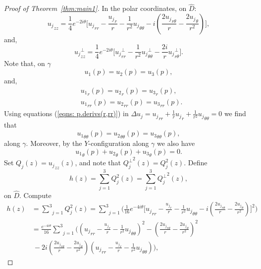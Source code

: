 \documentclass[11pt]{amsart}
\numberwithin{equation}{section}
\theoremstyle{theorem}
\theoremstyle{definition}
\numberwithin{equation}{section}
\begin{document}
\begin{proof}[Proof of Theorem~\ref{thm:main1}]
 In the polar coordinates, on $\hat{D}$:
 $$
 {u_j}_{zz} =\frac{1}{4} e^{-2i\theta}\Big[  {u_j}_{rr}-\frac{{u_j}_r}{r} - \frac{1}{r^2} {u_j}_{\theta \theta} - i(\frac{2{u_j}_{r\theta}}{r}-\frac{2{u_j}_{\theta}}{r^2}) \Big],
 $$
 and,
 $$
{u_j}_{zz}^{\perp} =\frac{1}{4} e^{-2i\theta}\Big[  {u_j}_{rr}^{\perp} - \frac{1}{r^2} {u_j}_{\theta \theta}^{\perp} - \frac{2i}{r} {u_j}_{r\theta}^{\perp} \Big].
$$
Note that, on $\gamma$ 
$$
u_1(p)=u_2(p)=u_3(p),
$$
and,
\begin{equation} \label{eqns: p.derivs(r,rr)}
    \begin{split}
       &  {u_1}_{r}(p) = {u_2}_{r}(p) = {u_3}_{r}(p),  \\
       & {u_1}_{rr}(p) = {u_2}_{rr}(p) = {u_3}_{rr}(p).
    \end{split}
\end{equation}
Using equations (\ref{eqns: p.derivs(r,rr)}) in $\Delta u_j ={u_j}_{rr}+\frac{1}{r}{u_j}_r+\frac{1}{r^2}{u_j}_{\theta \theta}=0$ we find that
\begin{equation} \label{eqn: p.deriv(theta,theta)}
  {u_1}_{\theta \theta}(p) ={u_2}_{\theta \theta}(p) ={u_3}_{\theta \theta} (p),  
\end{equation}
along $\gamma$.
Moreover, by the $Y$-configuration along $\gamma$ we also have
\begin{equation}\label{eqn:p.deriv(theta)}
 {u_1}_{\theta}(p) +  {u_2}_{\theta}(p) + {u_3}_{\theta}(p) =0.
\end{equation}
 Set $Q_j(z)={u_j}_{zz}(z)$, and note that ${Q_j^{\perp}}^2(z)=Q_j^2(z)$. Define
$$
h(z)=\underset{j=1}{\overset{3}{\sum}}Q_j^2(z)=\underset{j=1}{\overset{3}{\sum}}{Q_j^{\perp}}^2(z),
$$
on $\hat{D}$. Compute
\begin{equation}
\nonumber
\begin{split}
h(z)&=\underset{j=1}{\overset{3}{\sum}}Q_j^2(z)=\underset{j=1}{\overset{3}{\sum}} \Big ( \frac{1}{16}e^{-4i\theta}   \big [{u_j}_{rr}-\frac{{u_j}_r}{r} -\frac{1}{r^2}{u_j}_{\theta \theta}-i(\frac{2{u_j}_{r\theta}}{r}-\frac{{2u_j}_{\theta}}{r^2}) \big ]^2 \Big )\\
&= \frac{e^{-4i\theta}}{16} \underset{j=1}{\overset{3}{\sum}} \Big( ({u_j}_{rr}-\frac{{u_j}_r}{r} -\frac{1}{r^2}{u_j}_{\theta \theta} )^2 -(\frac{2{u_j}_{r\theta}}{r}-\frac{2{u_j}_{\theta}}{r^2})^2\\
&\ -2i (\frac{2{u_j}_{r\theta}}{r}-\frac{2{u_j}_{\theta}}{r^2}) ({u_j}_{rr}-\frac{{u_j}_r}{r}-\frac{1}{r^2}{u_j}_{\theta \theta} ) \Big),
\end{split}
\end{equation}

\end{proof}
\end{document}
